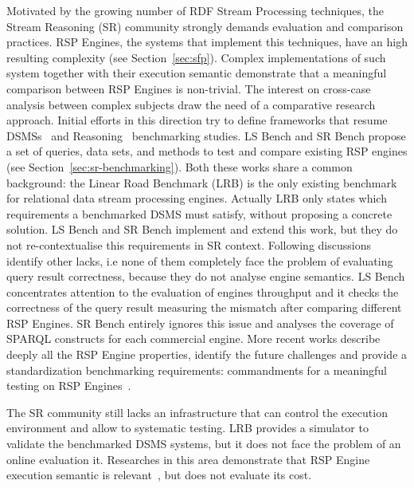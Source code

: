 Motivated by the growing number of RDF Stream Processing techniques, the Stream Reasoning (SR) community strongly demands evaluation and comparison practices. RSP Engines, the systems that implement this techniques, have an high resulting complexity (see Section~\ref{sec:sfp}). Complex implementations of such system together with their execution semantic demonstrate that a meaningful comparison between RSP Engines is non-trivial. %
The interest on cross-case analysis between complex subjects draw the need of a comparative research approach. Initial efforts in this direction try to define frameworks that resume  DSMSs~\cite{arasu2004linear} and Reasoning~\cite{Guo2005} benchmarking studies. LS Bench and SR Bench propose a set of queries, data sets, and methods to test and compare existing RSP engines (see Section~\ref{sec:sr-benchmarking}). Both these works share a common background: the Linear Road Benchmark (LRB) is the only existing benchmark for relational data stream processing engines. Actually LRB only states which requirements a benchmarked DSMS must satisfy, without proposing a concrete solution. LS Bench and SR Bench implement and extend this work, but they do not re-contextualise this requirements in SR context. Following discussions identify other lacks, i.e none of them completely face the problem of evaluating query result correctness, because they do not analyse engine semantics. LS Bench concentrates attention to the evaluation of engines throughput and it checks the correctness of the query result measuring the mismatch after comparing different RSP Engines. SR Bench entirely ignores this issue and analyses the coverage of SPARQL constructs for each commercial engine. More recent works describe deeply all the RSP Engine properties, identify the future challenges and provide a standardization benchmarking requirements: commandments for a meaningful testing on RSP Engines~\cite{DBLP:conf/esws/ScharrenbachUMVB13}.

The SR community still lacks an infrastructure that can control the execution environment and allow to systematic testing. LRB provides a simulator to validate the benchmarked DSMS systems, but it does not face the problem of an online evaluation it. Researches in this area demonstrate that RSP Engine execution semantic is relevant~\cite{Botan:2010:SMA:1920841.1920874}, but does not evaluate its cost.

